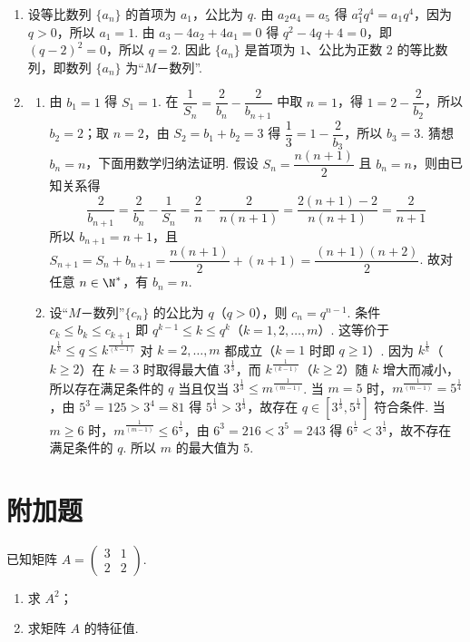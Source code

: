 \begin{solution}
\begin{enumerate}
\item 设等比数列 \(\{a_n\}\) 的首项为 \(a_1\)，公比为 \(q\). 由 \(a_2a_4=a_5\) 得 \(a_1^2q^4=a_1q^4\)，因为 \(q>0\)，所以 \(a_1=1\). 由 \(a_3-4a_2+4a_1=0\) 得 \(q^2-4q+4=0\)，即 \((q-2)^2=0\)，所以 \(q=2\). 因此 \(\{a_n\}\) 是首项为 \(1\)、公比为正数 \(2\) 的等比数列，即数列 \(\{a_n\}\) 为“\(M\)－数列”.
\item
\begin{enumerate}
\item 由 \(b_1=1\) 得 \(S_1=1\). 在 \(\dfrac1{S_n}=\dfrac2{b_n}-\dfrac2{b_{n+1}}\) 中取 \(n=1\)，得 \(1=2-\dfrac2{b_2}\)，所以 \(b_2=2\)；取 \(n=2\)，由 \(S_2=b_1+b_2=3\) 得 \(\dfrac13=1-\dfrac2{b_3}\)，所以 \(b_3=3\). 猜想 \(b_n=n\)，下面用数学归纳法证明. 假设 \(S_n=\dfrac{n(n+1)}2\) 且 \(b_n=n\)，则由已知关系得
\[
\frac2{b_{n+1}}=\frac2{b_n}-\frac1{S_n}=\frac2n-\frac2{n(n+1)}=\frac{2(n+1)-2}{n(n+1)}=\frac2{n+1}
\]
所以 \(b_{n+1}=n+1\)，且 \(S_{n+1}=S_n+b_{n+1}=\dfrac{n(n+1)}2+(n+1)=\dfrac{(n+1)(n+2)}2\). 故对任意 \(n\in\N^*\)，有 \(b_n=n\).
\item 设“\(M\)－数列”\(\{c_n\}\) 的公比为 \(q\)（\(q>0\)），则 \(c_n=q^{n-1}\). 条件 \(c_k\le b_k\le c_{k+1}\) 即 \(q^{k-1}\le k\le q^k\)（\(k=1,2,\dots,m\)）. 这等价于 \(k^{\frac{1}{k}}\le q\le k^{\frac{1}{(k-1)}}\) 对 \(k=2,\dots,m\) 都成立（\(k=1\) 时即 \(q\ge1\)）. 因为 \(k^{\frac{1}{k}}\)（\(k\ge2\)）在 \(k=3\) 时取得最大值 \(3^{\frac{1}{3}}\)，而 \(k^{\frac{1}{(k-1)}}\)（\(k\ge2\)）随 \(k\) 增大而减小，所以存在满足条件的 \(q\) 当且仅当 \(3^{\frac{1}{3}}\le m^{\frac{1}{(m-1)}}\). 当 \(m=5\) 时，\(m^{\frac{1}{(m-1)}}=5^{\frac{1}{4}}\)，由 \(5^3=125>3^4=81\) 得 \(5^{\frac{1}{4}}>3^{\frac{1}{3}}\)，故存在 \(q\in\left[3^{\frac{1}{3}},5^{\frac{1}{4}}\right]\) 符合条件. 当 \(m\ge6\) 时，\(m^{\frac{1}{(m-1)}}\le6^{\frac{1}{5}}\)，由 \(6^3=216<3^5=243\) 得 \(6^{\frac{1}{5}}<3^{\frac{1}{3}}\)，故不存在满足条件的 \(q\). 所以 \(m\) 的最大值为 \(5\).
\end{enumerate}
\end{enumerate}
\end{solution}

\section{附加题}

\begin{problem}[A]
已知矩阵 \(A=\begin{pmatrix}3&1\\2&2\end{pmatrix}\).

\begin{enumerate}
\item 求 \(A^2\)；
\item 求矩阵 \(A\) 的特征值.
\end{enumerate}

\end{problem}

